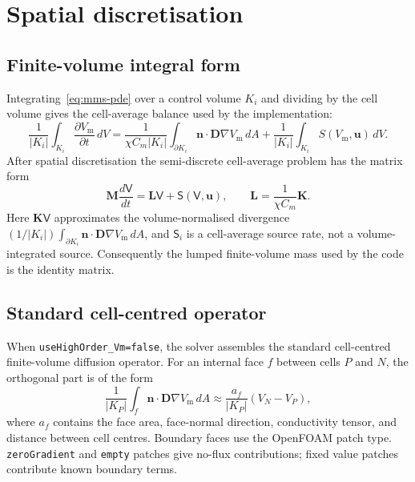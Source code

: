 \documentclass[11pt,a4paper]{article}
\newcommand{\code}[1]{\texttt{\small #1}}
\newcommand{\Vm}{V_{\text{m}}}
\newcommand{\Dten}{\mathbf{D}}
\newcommand{\grad}{\nabla}
\newcommand{\Mmass}{\mathbf{M}}
\newcommand{\Kstif}{\mathbf{K}}
\newcommand{\Lop}{\mathbf{L}}
\begin{document}
\section{Spatial discretisation}

\subsection{Finite-volume integral form}

Integrating~\eqref{eq:mms-pde} over a control volume $K_i$ and dividing by
the cell volume gives the cell-average balance used by the implementation:
\begin{equation}
  \frac{1}{|K_i|}\int_{K_i}\frac{\partial \Vm}{\partial t}\,dV
  =
  \frac{1}{\chi C_m|K_i|}
  \int_{\partial K_i}\mathbf{n}\cdot\Dten\grad\Vm\,dA
  +
  \frac{1}{|K_i|}\int_{K_i}S(\Vm,\mathbf{u})\,dV.
  \label{eq:fv-integral}
\end{equation}
After spatial discretisation the semi-discrete cell-average problem has the
matrix form
\begin{equation}
  \Mmass \frac{d\mathsf{V}}{dt}
  =
  \Lop \mathsf{V}
  +
  \mathsf{S}(\mathsf{V},\mathbf{u}),
  \qquad
  \Lop = \frac{1}{\chi C_m}\Kstif.
  \label{eq:semidiscrete}
\end{equation}
Here $\Kstif\mathsf{V}$ approximates the volume-normalised divergence
$(1/|K_i|)\int_{\partial K_i}\mathbf{n}\cdot\Dten\grad\Vm\,dA$, and
$\mathsf{S}_i$ is a cell-average source rate, not a volume-integrated source.
Consequently the lumped finite-volume mass used by the code is the identity
matrix.

\subsection{Standard cell-centred operator}
\label{sec:std-operator}

When \code{useHighOrder\_Vm=false}, the solver assembles the standard
cell-centred finite-volume diffusion operator. For an internal face $f$ between
cells $P$ and $N$, the orthogonal part is of the form
\begin{equation}
  \frac{1}{|K_P|}\int_f \mathbf{n}\cdot\Dten\grad\Vm\,dA
  \approx
  \frac{a_f}{|K_P|}(V_N-V_P),
\end{equation}
where $a_f$ contains the face area, face-normal direction, conductivity tensor,
and distance between cell centres. Boundary faces use the OpenFOAM patch type.
\code{zeroGradient} and \code{empty} patches give no-flux contributions; fixed
value patches contribute known boundary terms.
\end{document}
